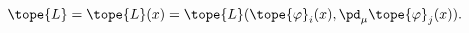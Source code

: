 \begin{equation}	\label{2.1}
\tope{L}
=
\tope{L} (x)
=
\tope{L} (\tope{\varphi}_i(x) , \pd_\mu\tope{\varphi}_j(x) ) .
	\end{equation}


